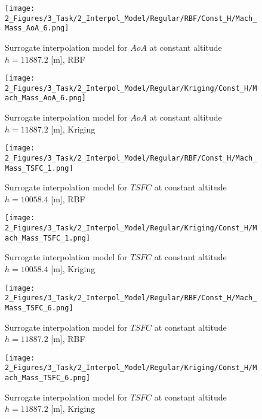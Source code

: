 \begin{figure}[!h]
    \begin{minipage}[h]{0.46\textwidth}
        \centering
        \texttt{[image: 2\_Figures/3\_Task/2\_Interpol\_Model/Regular/RBF/Const\_H/Mach\_Mass\_AoA\_6.png]}
        \caption{Surrogate interpolation model for $AoA$ at constant altitude $h = 11887.2$ [m], RBF}
        \label{fig_58}    
    \end{minipage}
    \hfill
    \begin{minipage}{0.46\textwidth}
        \centering
        \texttt{[image: 2\_Figures/3\_Task/2\_Interpol\_Model/Regular/Kriging/Const\_H/Mach\_Mass\_AoA\_6.png]}
        \caption{Surrogate interpolation model for $AoA$ at constant altitude $h = 11887.2$ [m], Kriging}
        \label{fig_59}    
    \end{minipage}
\end{figure} 

\begin{figure}[!h]
    \begin{minipage}[h]{0.46\textwidth}
        \centering
        \texttt{[image: 2\_Figures/3\_Task/2\_Interpol\_Model/Regular/RBF/Const\_H/Mach\_Mass\_TSFC\_1.png]}
        \caption{Surrogate interpolation model for $TSFC$ at constant altitude $h = 10058.4$ [m], RBF}
        \label{fig_60}    
    \end{minipage}
    \hfill
    \begin{minipage}{0.46\textwidth}
        \centering
        \texttt{[image: 2\_Figures/3\_Task/2\_Interpol\_Model/Regular/Kriging/Const\_H/Mach\_Mass\_TSFC\_1.png]}
        \caption{Surrogate interpolation model for $TSFC$ at constant altitude $h = 10058.4$ [m], Kriging}
        \label{fig_61}    
    \end{minipage}
\end{figure} 

\begin{figure}[!h]
    \begin{minipage}[h]{0.46\textwidth}
        \centering
        \texttt{[image: 2\_Figures/3\_Task/2\_Interpol\_Model/Regular/RBF/Const\_H/Mach\_Mass\_TSFC\_6.png]}
        \caption{Surrogate interpolation model for $TSFC$ at constant altitude $h = 11887.2$ [m], RBF}
        \label{fig_62}    
    \end{minipage}
    \hfill
    \begin{minipage}{0.46\textwidth}
        \centering
        \texttt{[image: 2\_Figures/3\_Task/2\_Interpol\_Model/Regular/Kriging/Const\_H/Mach\_Mass\_TSFC\_6.png]}
        \caption{Surrogate interpolation model for $TSFC$ at constant altitude $h = 11887.2$ [m], Kriging}
        \label{fig_63}    
    \end{minipage}
\end{figure} 

